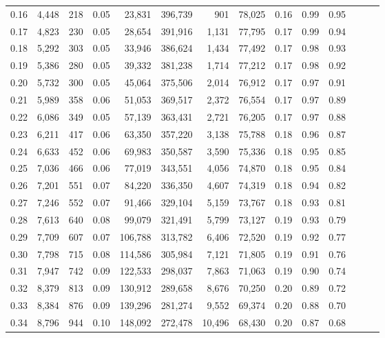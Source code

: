 \begin{tabular}{rrrrrrrrrrrrrr}
0.16 &  4,448 &    218 &  0.05 &   23,831 &  396,739 &     901 &  78,025 &  0.16 &  0.99 &      0.95 \\
0.17 &  4,823 &    230 &  0.05 &   28,654 &  391,916 &   1,131 &  77,795 &  0.17 &  0.99 &      0.94 \\
0.18 &  5,292 &    303 &  0.05 &   33,946 &  386,624 &   1,434 &  77,492 &  0.17 &  0.98 &      0.93 \\
0.19 &  5,386 &    280 &  0.05 &   39,332 &  381,238 &   1,714 &  77,212 &  0.17 &  0.98 &      0.92 \\
0.20 &  5,732 &    300 &  0.05 &   45,064 &  375,506 &   2,014 &  76,912 &  0.17 &  0.97 &      0.91 \\
0.21 &  5,989 &    358 &  0.06 &   51,053 &  369,517 &   2,372 &  76,554 &  0.17 &  0.97 &      0.89 \\
0.22 &  6,086 &    349 &  0.05 &   57,139 &  363,431 &   2,721 &  76,205 &  0.17 &  0.97 &      0.88 \\
0.23 &  6,211 &    417 &  0.06 &   63,350 &  357,220 &   3,138 &  75,788 &  0.18 &  0.96 &      0.87 \\
0.24 &  6,633 &    452 &  0.06 &   69,983 &  350,587 &   3,590 &  75,336 &  0.18 &  0.95 &      0.85 \\
0.25 &  7,036 &    466 &  0.06 &   77,019 &  343,551 &   4,056 &  74,870 &  0.18 &  0.95 &      0.84 \\
0.26 &  7,201 &    551 &  0.07 &   84,220 &  336,350 &   4,607 &  74,319 &  0.18 &  0.94 &      0.82 \\
0.27 &  7,246 &    552 &  0.07 &   91,466 &  329,104 &   5,159 &  73,767 &  0.18 &  0.93 &      0.81 \\
0.28 &  7,613 &    640 &  0.08 &   99,079 &  321,491 &   5,799 &  73,127 &  0.19 &  0.93 &      0.79 \\
0.29 &  7,709 &    607 &  0.07 &  106,788 &  313,782 &   6,406 &  72,520 &  0.19 &  0.92 &      0.77 \\
0.30 &  7,798 &    715 &  0.08 &  114,586 &  305,984 &   7,121 &  71,805 &  0.19 &  0.91 &      0.76 \\
0.31 &  7,947 &    742 &  0.09 &  122,533 &  298,037 &   7,863 &  71,063 &  0.19 &  0.90 &      0.74 \\
0.32 &  8,379 &    813 &  0.09 &  130,912 &  289,658 &   8,676 &  70,250 &  0.20 &  0.89 &      0.72 \\
0.33 &  8,384 &    876 &  0.09 &  139,296 &  281,274 &   9,552 &  69,374 &  0.20 &  0.88 &      0.70 \\
0.34 &  8,796 &    944 &  0.10 &  148,092 &  272,478 &  10,496 &  68,430 &  0.20 &  0.87 &      0.68 \\

\end{tabular}
